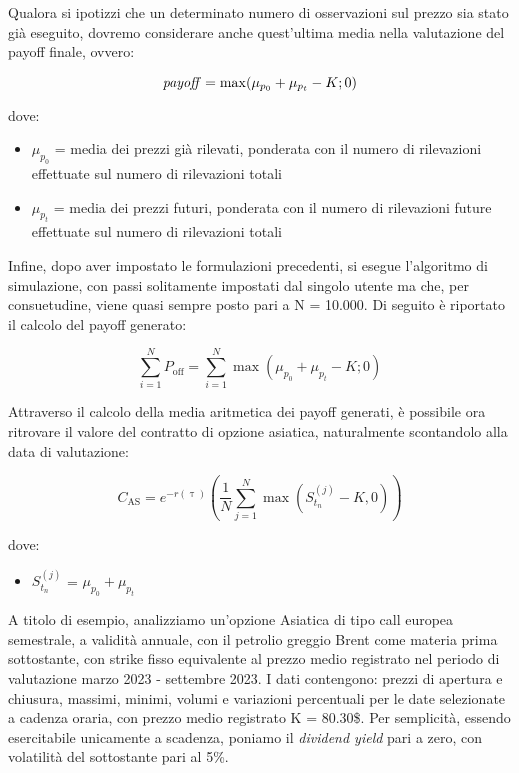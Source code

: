 \documentclass[12pt,a4paper]{report}
\begin{document}
Qualora si ipotizzi che un determinato numero di osservazioni sul prezzo sia stato già eseguito, dovremo considerare anche quest'ultima media nella valutazione del payoff finale, ovvero:

\begin{equation}
    \text{\textit{payoff}} = \max( \mu_{p_0} + \mu_{p_t} - K; 0)
\end{equation}

dove: 

\begin{itemize}
    \item $\mu_{p_0}$ = media dei prezzi già rilevati, ponderata con il numero di rilevazioni effettuate sul numero di rilevazioni totali
    \item $\mu_{p_t}$ = media dei prezzi futuri, ponderata con il numero di rilevazioni future effettuate sul numero di rilevazioni totali
\end{itemize}

Infine, dopo aver impostato le formulazioni precedenti, si esegue l'algoritmo di simulazione, con passi solitamente impostati dal singolo utente ma che, per consuetudine, viene quasi sempre posto pari a N = 10.000. Di seguito è riportato il calcolo del payoff generato:

\begin{equation}
    \sum_{i=1}^{N} P_{\text{off}} = \sum_{i=1}^{N} \max( \mu_{p_0} + \mu_{p_t} - K; 0)
\end{equation}

Attraverso il calcolo della media aritmetica dei payoff generati, è possibile ora ritrovare il valore del contratto di opzione asiatica, naturalmente scontandolo alla data di valutazione:

\begin{equation}
C_{\text{AS}} = e^{-r(\uptau)} \left( \frac{1}{N} \sum_{j=1}^{N} \max \left( S_{t_n}^{(j)} - K, 0 \right) \right)
\end{equation}

dove: 

\begin{itemize}
    \item $S_{t_n}^{(j)}$ = $\mu_{p_0} + \mu_{p_t}$
\end{itemize}



A titolo di esempio, analizziamo un'opzione Asiatica di tipo call europea semestrale, a validità annuale, con il petrolio greggio Brent come materia prima sottostante, con strike fisso equivalente al prezzo medio registrato nel periodo di valutazione marzo 2023 - settembre 2023. I dati contengono: prezzi di apertura e chiusura, massimi, minimi, volumi e variazioni percentuali per le date selezionate a cadenza oraria, con prezzo medio registrato K = 80.30\$. Per semplicità, essendo esercitabile unicamente a scadenza, poniamo il \textit{dividend yield} pari a zero, con volatilità del sottostante pari al 5\%. 
\end{document}
